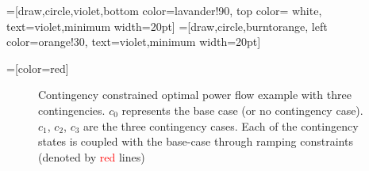 
\def\lav{lavander!90}
\def\oran{orange!30}

=[draw,circle,violet,bottom color=\lav,
                  top color= white, text=violet,minimum width=20pt]
=[draw,circle,burntorange, left color=\oran,
                       text=violet,minimum width=20pt]
                       
=[color=red]

\begin{figure}[h!]
\centering
{}
\caption{Contingency constrained optimal power flow example with three contingencies. $c_0$ represents the base case (or no contingency case). $c_1$, $c_2$, $c_3$ are the three contingency cases. Each of the contingency states is coupled with the base-case through ramping constraints (denoted by \textcolor{red}{red} lines)}
\label{fig:scopflow}
\end{figure}